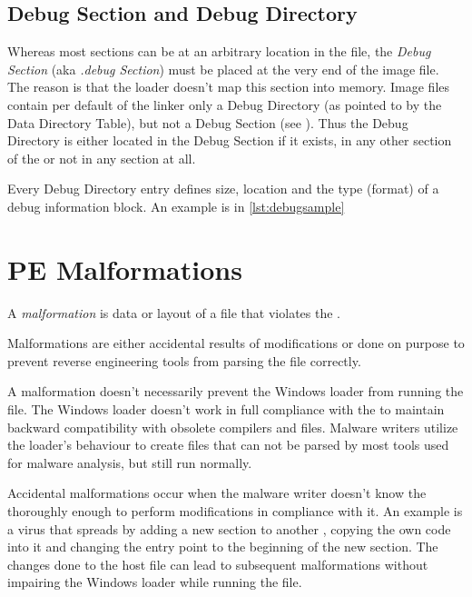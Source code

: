 \subsection*{Debug Section and Debug Directory}

Whereas most sections can be at an arbitrary location in the file, the \emph{Debug Section} (aka \emph{.debug Section}) must be placed at the very end of the image file. The reason is that the loader doesn't map this section into memory. Image files contain per default of the linker only a Debug Directory (as pointed to by the Data Directory Table), but not a Debug Section (see \cite[]{pespec}). Thus the Debug Directory is either located in the Debug Section if it exists, in any other section of the \PE{} or not in any section at all.

Every Debug Directory entry defines \ia{} size, location and the type (format) of a debug information block. An example is in \autoref{lst:debugsample}



\section{PE Malformations}

\begin{definition}[Malformation]
A \emph{malformation} is data or layout of a \PE{} file that violates the \PECOFF{}.
\end{definition} 

Malformations are either accidental results of \PE{} modifications or done on purpose to prevent reverse engineering tools from parsing the file correctly.

A malformation doesn't necessarily prevent the Windows loader from running the file. The Windows loader doesn't work in full compliance with the \PECOFF{} to maintain backward compatibility with obsolete compilers and files. Malware writers utilize the loader's behaviour to create \PE{} files that can not be parsed by most tools used for malware analysis, but still run normally. 

Accidental malformations occur when the malware writer doesn't know the \PECOFF{} thoroughly enough to perform modifications in compliance with it. An example is a virus that spreads by adding a new section to another \PE{}, copying the own code into it and changing the entry point to the beginning of the new section. The changes done to the host file can lead to subsequent malformations without impairing the Windows loader while running the file.

